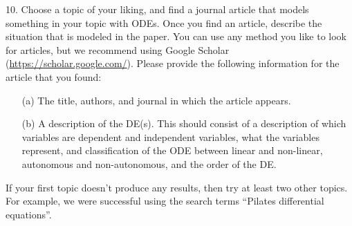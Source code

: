 \documentclass[12pt,letterpaper]{hmcpset}
\begin{document}
\begin{problem}
10. Choose a topic of your liking, and find a journal article that models something in your topic
with ODEs. Once you find an article, describe the situation that is modeled in the paper.
You can use any method you like to look for articles, but we recommend using Google Scholar
(\url{https://scholar.google.com/}). Please provide the following information for the article that
you found:
 \begin{enumerate}
     \item[(a)] The title, authors, and journal in which the article appears.
     \item[(b)] A description of the DE(s). This should consist of a description of which variables are
dependent and independent variables, what the variables represent, and classification
of the ODE between linear and non-linear, autonomous and non-autonomous, and the
order of the DE.
 \end{enumerate}

If your first topic doesn’t produce any results, then try at least two other topics. For example,
we were successful using the search terms “Pilates differential equations”.

\end{problem}
\newpage
\end{document}
